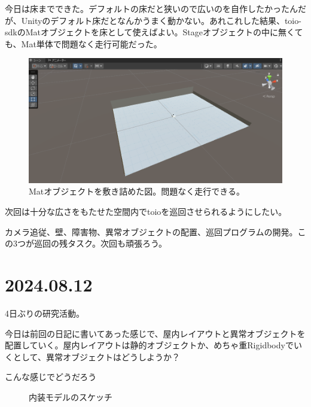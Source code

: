 \documentclass[fleqn,twocolumn]{mynote}
\begin{document}
今日は床までできた。デフォルトの床だと狭いので広いのを自作したかったんだが、Unityのデフォルト床だとなんかうまく動かない。あれこれした結果、toio-sdkのMatオブジェクトを床として使えばよい。Stageオブジェクトの中に無くても、Mat単体で問題なく走行可能だった。

\begin{figure}[h]
  \centering
  \includegraphics[keepaspectratio, width=0.8\columnwidth]{resources/2024-08-09-mat.png}
  \caption[short]{Matオブジェクトを敷き詰めた図。問題なく走行できる。}
  \label{fig:20240809-mat}
\end{figure}

次回は十分な広さをもたせた空間内でtoioを巡回させられるようにしたい。

カメラ追従、壁、障害物、異常オブジェクトの配置、巡回プログラムの開発。この3つが巡回の残タスク。次回も頑張ろう。

\section*{2024.08.12}
4日ぶりの研究活動。

今日は前回の日記に書いてあった感じで、屋内レイアウトと異常オブジェクトを配置していく。屋内レイアウトは静的オブジェクトか、めちゃ重Rigidbodyでいくとして、異常オブジェクトはどうしようか？

こんな感じでどうだろう

\fboxsep=0pt             %
\fboxrule=1pt            %
\begin{figure}[h]
  \centering
  \caption{内装モデルのスケッチ}
  \label{fig:interior-sketch}
\end{figure}
\end{document}
